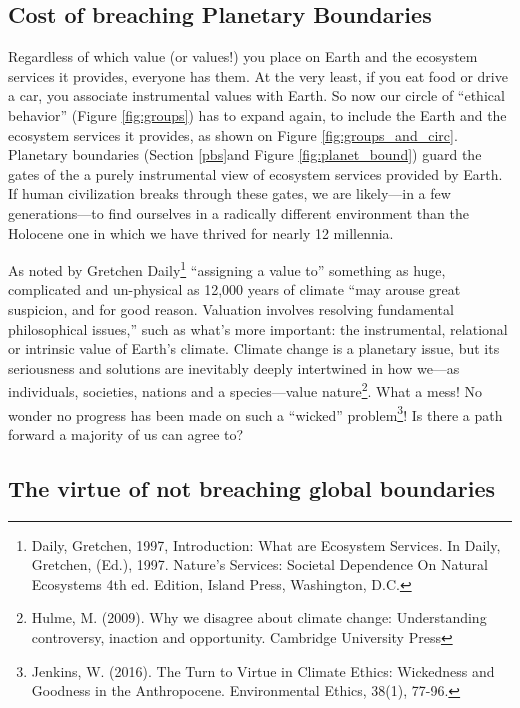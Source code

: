 \documentclass[amstex,12pt]{book}
\begin{document}
\subsection{Cost of breaching Planetary Boundaries}\label{breach}
Regardless of which value (or values!) you place on Earth and the ecosystem services it provides, everyone has them. At the very least, if you eat food or drive a car, you associate instrumental values with Earth. So now our circle of ``ethical behavior'' (Figure \ref{fig:groups}) has to expand again, to include the Earth and the ecosystem services it provides, as shown on Figure \ref{fig:groups_and_circ}. Planetary boundaries (Section \ref{pbs}and Figure \ref{fig:planet_bound}) guard the gates of the a purely instrumental view of ecosystem services provided by Earth. If human civilization breaks through these gates, we are likely---in a few generations---to find ourselves in a radically different environment than the Holocene one in which we have thrived for nearly 12 millennia. 

As noted by Gretchen Daily\footnote{Daily, Gretchen, 1997, Introduction: What are Ecosystem Services. In Daily, Gretchen, (Ed.), 1997. Nature's Services: Societal Dependence On Natural Ecosystems 4th ed. Edition, Island Press, Washington, D.C.} ``assigning a value to'' something as huge, complicated and un-physical as 12,000 years of climate ``may arouse great suspicion, and for good reason. Valuation involves resolving fundamental philosophical issues,'' such as what's more important: the instrumental, relational or intrinsic value of Earth's climate. Climate change is a planetary issue, but its seriousness and solutions are inevitably deeply intertwined in how we---as individuals, societies, nations and a species---value nature\footnote{Hulme, M. (2009). Why we disagree about climate change: Understanding controversy, inaction and opportunity. Cambridge University Press}. What a mess! No wonder no progress has been made on such a ``wicked'' problem\footnote{Jenkins, W. (2016). The Turn to Virtue in Climate Ethics: Wickedness and Goodness in the Anthropocene. Environmental Ethics, 38(1), 77-96.}! Is there a path forward a majority of us can agree to?

\subsection{The virtue of not breaching global boundaries}
\end{document}
